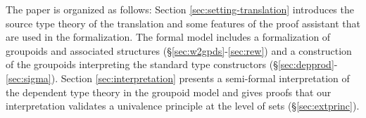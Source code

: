 


The paper is organized as follows: Section \ref{sec:setting-translation}
introduces the source type theory of the translation and some features of the proof assistant
that are used in the formalization. The formal model includes a
formalization of groupoids and associated structures
(\S\ref{sec:w2gpds}-\ref{sec:rew}) and a construction of the groupoids
interpreting the standard type constructors
(\S\ref{sec:depprod}-\ref{sec:sigma}). Section
\ref{sec:interpretation} presents a semi-formal interpretation of the
dependent type theory in the groupoid model and gives proofs that our
interpretation validates a univalence principle at the level of sets
(\S\ref{sec:extprinc}).
%

